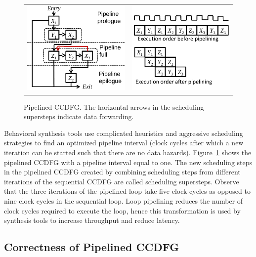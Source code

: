 \begin{figure}
\begin{center}
\begin{tabular}{cc}
\includegraphics[height=1.8in]{fig-rpe/pipelined_ccdfg}
& \hspace{0.5cm}
\includegraphics[height=1.8in]{fig-rpe/pp-clock-cycles}
\end{tabular}
\end{center}
\caption{Pipelined CCDFG. The horizontal arrows in the scheduling supersteps indicate data forwarding.}
\label{fig:pp-ccdfg}
\end{figure}

Behavioral synthesis tools use complicated heuristics and aggressive scheduling strategies to find an optimized pipeline interval (clock cycles after which a new iteration can be started such that there are no data hazards). Figure~\ref{fig:pp-ccdfg} shows the pipelined CCDFG with a pipeline interval equal to one. The new scheduling steps in the pipelined CCDFG created by combining scheduling steps from different iterations of the sequential CCDFG are called scheduling supersteps. Observe that the three iterations of the pipelined loop take five clock cycles as opposed to nine clock cycles in the sequential loop. Loop pipelining reduces the number of clock cycles required to execute the loop, hence this transformation is used by synthesis tools to increase throughput and reduce latency.  

\subsection{Correctness of Pipelined CCDFG}
\label{subsec:correctness-defn}

